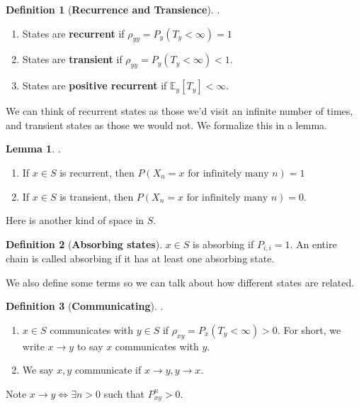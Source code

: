 \documentclass[12pt]{article}
\theoremstyle{definition}
\newtheorem{definition}{Definition}[section]
\newtheorem{lemma}[theorem]{Lemma}
\begin{document}
\begin{definition}[\textbf{Recurrence and Transience}]. \newline

  \begin{enumerate}
    \item States are \textbf{recurrent} if $\rho_{yy} = P_y(T_y < \infty) = 1$
    \item States are \textbf{transient} if $\rho_{yy} = P_y(T_y < \infty) < 1$.
    \item States are \textbf{positive recurrent} if $\mathbb{E}_y[T_y] < \infty$.
  \end{enumerate}
\end{definition}

We can think of recurrent states as those we'd visit an infinite number of times, and transient states as those we would not. We formalize this in a lemma.


\begin{lemma}. \newline
  \begin{enumerate}
    \item If $x \in S$ is recurrent, then $P(X_n = x \text{ for infinitely many $n$}) = 1$
    \item If $x \in S$ is transient, then $P(X_n = x \text{ for infinitely many $n$}) = 0$.
  \end{enumerate}
\end{lemma}

Here is another kind of space in $S$.


\begin{definition}[\textbf{Absorbing states}]
  $x \in S$ is absorbing if $P_{i,i} = 1$. An entire chain is called absorbing if it has at least one absorbing state.
\end{definition}

We also define some terms so we can talk about how different states are related.


\begin{definition}[\textbf{Communicating}] . \newline

  \begin{enumerate}
    \item $x \in S$ communicates with $y \in S$ if $\rho_{xy} = P_x(T_y < \infty) > 0.$ For short, we write $x \rightarrow y$ to say $x$ communicates with $y$.
    \item We say $x,y$ communicate if $x \rightarrow y, y \rightarrow x$.
  \end{enumerate}

  Note $x \rightarrow y \iff \exists n > 0$ such that $P_{xy}^n > 0$.
\end{definition}
\end{document}
